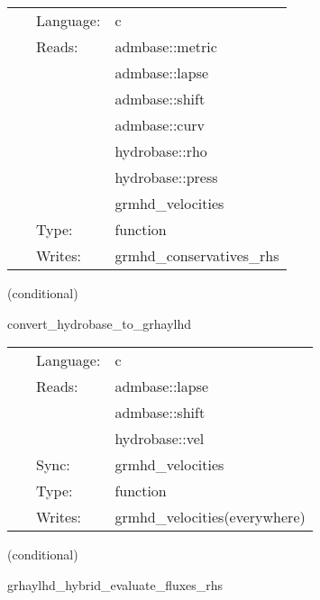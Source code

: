 \documentclass{article}
\begin{document}
 \begin{tabular*}{160mm}{cll} 
~ & Language:  & c \\ 
~ & Reads:  & admbase::metric \\ 
~& ~ &admbase::lapse\\ 
~& ~ &admbase::shift\\ 
~& ~ &admbase::curv\\ 
~& ~ &hydrobase::rho\\ 
~& ~ &hydrobase::press\\ 
~& ~ &grmhd\_velocities\\ 
~ & Type:  & function \\ 
~ & Writes:  & grmhd\_conservatives\_rhs \\ 
\end{tabular*} 


\vspace{5mm}

   (conditional) 

\hspace{5mm} convert\_hydrobase\_to\_grhaylhd 

\hspace{5mm}{\it convert hydrobase initial data to grhaylhd variables } 


\hspace{5mm}

 \begin{tabular*}{160mm}{cll} 
~ & Language:  & c \\ 
~ & Reads:  & admbase::lapse \\ 
~& ~ &admbase::shift\\ 
~& ~ &hydrobase::vel\\ 
~ & Sync:  & grmhd\_velocities \\ 
~ & Type:  & function \\ 
~ & Writes:  & grmhd\_velocities(everywhere) \\ 
\end{tabular*} 


\vspace{5mm}

   (conditional) 

\hspace{5mm} grhaylhd\_hybrid\_evaluate\_fluxes\_rhs 

\hspace{5mm}{\it hybrid version of grhaylhd\_evaluate\_fluxes\_rhs } 


\hspace{5mm}
\end{document}
